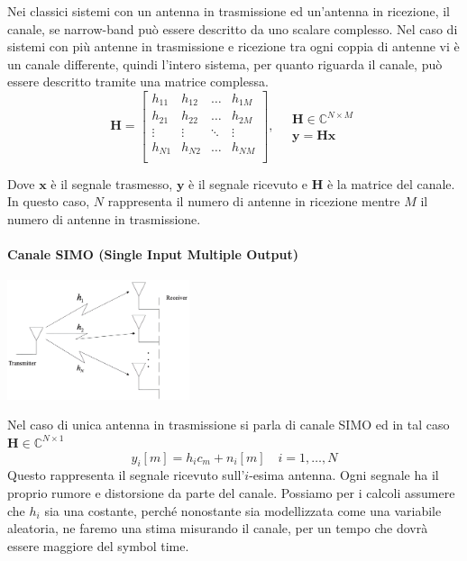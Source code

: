 Nei classici sistemi con un antenna in trasmissione ed un'antenna in ricezione, il canale, se narrow-band può essere descritto da uno scalare complesso.
Nel caso di sistemi con più antenne in trasmissione e ricezione tra ogni coppia di antenne vi è un canale differente, quindi l'intero sistema, per quanto riguarda il canale, può essere descritto tramite una matrice complessa.
\[ 
    \mathbf{H} = 
    \begin{bmatrix}
        h_{11} & h_{12} & \ldots & h_{1M} \\
        h_{21} & h_{22} & \ldots & h_{2M} \\
        \vdots & \vdots & \ddots & \vdots \\
        h_{N1} & h_{N2} & \ldots & h_{NM} \\
    \end{bmatrix}
    , \quad
    \begin{array}{ll}
            \mathbf{H} \in \mathbb{C}^{N \times M} \\
            \mathbf{y} = \mathbf{Hx} 
    \end{array}
\]

Dove $\mathbf{x}$ è il segnale trasmesso, $\mathbf{y}$ è il segnale ricevuto e $\mathbf{H}$ è la matrice del canale. In questo caso, $N$ rappresenta il numero di antenne in ricezione mentre $M$ il numero di antenne in trasmissione.
\paragraph*{Canale SIMO (Single Input Multiple Output)}
\begin{center}
    \includegraphics[width=0.4\textwidth]{imgs/simo.jpg}
\end{center}
Nel caso di unica antenna in trasmissione si parla di canale SIMO ed in tal caso $\mathbf{H} \in \mathbb{C}^{N \times 1}$
\[
    y_i[m] = h_i c_m + n_i[m] \quad i = 1, \ldots, N
\]
Questo rappresenta il segnale ricevuto sull'$i$-esima antenna.
Ogni segnale ha il proprio rumore e distorsione da parte del canale.
Possiamo per i calcoli assumere che $h_i$ sia una costante, perché nonostante sia modellizzata come una variabile aleatoria, ne faremo una stima misurando il canale, per un tempo che dovrà essere maggiore del symbol time.

